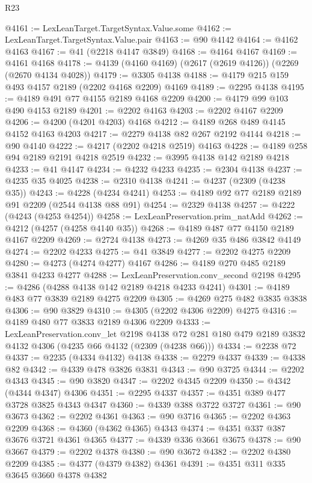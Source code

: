 \begin{lexlean}{R23}
\begin{coremodule}
{{{{{{{{{{{{{{{{{{{{{@4161 := LexLeanTarget.TargetSyntax.Value.some
@4162 := LexLeanTarget.TargetSyntax.Value.pair
@4163 := @90 @4142
@4164 := @4162 @4163
@4167 := @41 (@2218 @4147 @3849)
@4168 := @4164 @4167
@4169 := @4161 @4168
@4178 := @4139 (@4160 @4169) (@2617 (@2619 @4126)) (@2269 (@2670 @4134 @4028))
@4179 := @3305 @4138
@4188 := @4179 @215 @159 @493 @4157 @2189 (@2202 @4168 @2209) @4169
@4189 := @2295 @4138
@4195 := @4189 @491 @77 @4155 @2189 @4168 @2209
@4200 := @4179 @99 @103 @490 @4153 @2189
@4201 := @2202 @4163
@4203 := @2202 @4167 @2209
@4206 := @4200 (@4201 @4203) @4168
@4212 := @4189 @268 @489 @4145 @4152 @4163 @4203
@4217 := @2279 @4138 @82 @267 @2192 @4144
@4218 := @90 @4140
@4222 := @4217 (@2202 @4218 @2519) @4163
@4228 := @4189 @258 @94 @2189 @2191 @4218 @2519
@4232 := @3995 @4138 @142 @2189 @4218
@4233 := @41 @4147
@4234 := @4232 @4233
@4235 := @2304 @4138
@4237 := @4235 @35 @4025
@4238 := @2310 @4138
@4241 := @4237 (@2309 (@4238 @35))
@4243 := @4228 (@4234 @4241)
@4253 := @4189 @92 @77 @2189 @2189 @91 @2209 (@2544 @4138 @88 @91)
@4254 := @2329 @4138
@4257 := @4222 (@4243 (@4253 @4254))
@4258 := LexLeanPreservation.prim_natAdd
@4262 := @4212 (@4257 (@4258 @4140 @35))
@4268 := @4189 @487 @77 @4150 @2189 @4167 @2209
@4269 := @2724 @4138
@4273 := @4269 @35 @486 @3842 @4149
@4274 := @2202 @4233
@4275 := @41 @3849
@4277 := @2202 @4275 @2209
@4280 := @4273 (@4274 @4277) @4167
@4286 := @4189 @270 @485 @2189 @3841 @4233 @4277
@4288 := LexLeanPreservation.conv_second @2198
@4295 := @4286 (@4288 @4138 @142 @2189 @4218 @4233 @4241)
@4301 := @4189 @483 @77 @3839 @2189 @4275 @2209
@4305 := @4269 @275 @482 @3835 @3838
@4306 := @90 @3829
@4310 := @4305 (@2202 @4306 @2209) @4275
@4316 := @4189 @480 @77 @3833 @2189 @4306 @2209
@4333 := LexLeanPreservation.conv_let
    @2198
    @4138
    @72
    @281
    @180
    @479
    @2189
    @3832
    @4132
    @4306
    (@4235 @66 @4132 (@2309 (@4238 @66)))
@4334 := @2238 @72
@4337 := @2235 (@4334 @4132) @4138
@4338 := @2279 @4337
@4339 := @4338 @82
@4342 := @4339 @478 @3826 @3831
@4343 := @90 @3725
@4344 := @2202 @4343
@4345 := @90 @3820
@4347 := @2202 @4345 @2209
@4350 := @4342 (@4344 @4347) @4306
@4351 := @2295 @4337
@4357 := @4351 @389 @477 @3728 @3825 @4343 @4347
@4360 := @4339 @388 @3722 @3727
@4361 := @90 @3673
@4362 := @2202 @4361
@4363 := @90 @3716
@4365 := @2202 @4363 @2209
@4368 := @4360 (@4362 @4365) @4343
@4374 := @4351 @337 @387 @3676 @3721 @4361 @4365
@4377 := @4339 @336 @3661 @3675
@4378 := @90 @3667
@4379 := @2202 @4378
@4380 := @90 @3672
@4382 := @2202 @4380 @2209
@4385 := @4377 (@4379 @4382) @4361
@4391 := @4351 @311 @335 @3645 @3660 @4378 @4382
}}}}}}}}}}}}}}}}}}}}}
\end{coremodule}
\end{lexlean}
